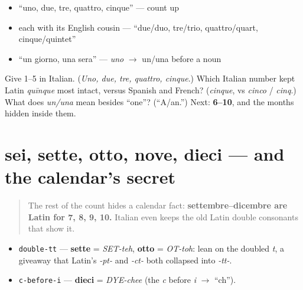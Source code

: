 \begin{itemize}
\raggedright
  \item \textquotedblleft{}uno, due, tre, quattro, cinque\textquotedblright{} — count up
  \item each with its English cousin — \textquotedblleft{}due/duo, tre/trio, quattro/quart, cinque/quintet\textquotedblright{}
  \item \textquotedblleft{}un giorno, una sera\textquotedblright{} — \emph{uno} $\to$ un/una before a noun
\end{itemize}

\begin{tcolorbox}[breakable,colback=teal!4,colframe=teal!35!black,title={Before you move on}]
Give 1–5 in Italian. (\emph{Uno, due, tre, quattro, cinque}.) Which Italian number kept Latin \emph{quīnque} most intact, versus Spanish and French? (\emph{cinque}, vs \emph{cinco} / \emph{cinq}.) What does \emph{un/una} mean besides \textquotedblleft{}one\textquotedblright{}? (\textquotedblleft{}A/an.\textquotedblright{}) Next: \textbf{6–10}, and the months hidden inside them.
\end{tcolorbox}
\section[sei, sette, otto, nove, dieci]{sei, sette, otto, nove, dieci — and the calendar's secret}

\label{lesson:IT-C06-numeri-6-10}



\begin{quote}
The rest of the count hides a calendar fact: \textbf{settembre–dicembre are Latin for 7, 8, 9, 10.} Italian even keeps the old Latin double consonants that show it.
\end{quote}

\begin{sounds}
\begin{itemize}
\raggedright
  \item \texttt{double-tt} — \textbf{sette} = \emph{SET-teh}, \textbf{otto} = \emph{OT-toh}: lean on the doubled \emph{t}, a giveaway that Latin's \emph{-pt-} and \emph{-ct-} both collapsed into \emph{-tt-}.
  \item \texttt{c-before-i} — \textbf{dieci} = \emph{DYE-chee} (the \emph{c} before \emph{i} $\to$ \textquotedblleft{}ch\textquotedblright{}).
\end{itemize}
\end{sounds}

